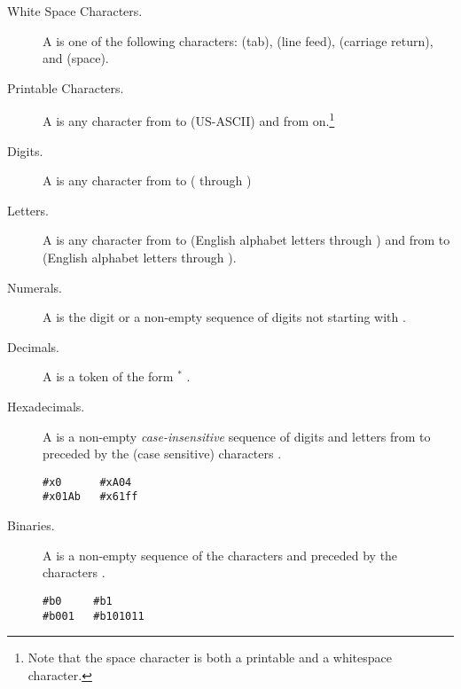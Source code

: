 \begin{description}
\item[White Space Characters.]
A  is one of the following characters:
 (tab), 
 (line feed),
 (carriage return), and
 (space).

\item[Printable Characters.]
A  is any character from 
 to  (US-ASCII) and from  on.\footnote{%
Note that the space character is both a printable and a whitespace character.
}

\item[Digits.]
A  is any character from  to  
( through )

\item[Letters.]
A  is any character 
from  to  (English alphabet letters  through ) and
from  to  (English alphabet letters  through ).

\item[Numerals.]
A  is the digit  or a non-empty sequence of digits not starting with  .

\item[Decimals.]
A  is
a token of the form \!\!\!\!$^*$ .

\item[Hexadecimals.]
A  is a non-empty \emph{case-insensitive} sequence of digits and letters from  to  
preceded by the (case sensitive) characters  .
\smallskip

\begin{lstlisting}[linewidth=11.6em]
#x0      #xA04  
#x01Ab   #x61ff
\end{lstlisting}

\item[Binaries.]
A  is a non-empty sequence of the characters  and 
preceded by the characters  .

\begin{lstlisting}[linewidth=12.5em]
#b0     #b1
#b001   #b101011
\end{lstlisting}


\end{description}
